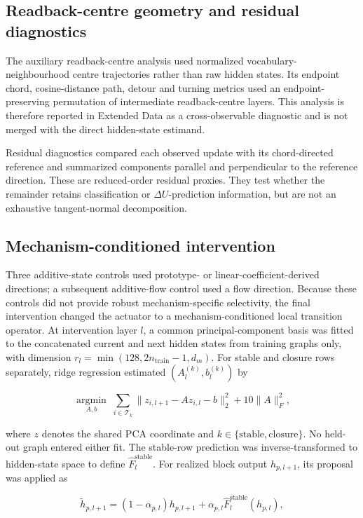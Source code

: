 \documentclass[12pt]{article}
\begin{document}
\subsection*{Readback-centre geometry and residual diagnostics}

The auxiliary readback-centre analysis used normalized vocabulary-neighbourhood centre trajectories rather than raw hidden states. Its endpoint chord, cosine-distance path, detour and turning metrics used an endpoint-preserving permutation of intermediate readback-centre layers. This analysis is therefore reported in Extended Data as a cross-observable diagnostic and is not merged with the direct hidden-state estimand.

Residual diagnostics compared each observed update with its chord-directed reference and summarized components parallel and perpendicular to the reference direction. These are reduced-order residual proxies. They test whether the remainder retains classification or \(\Delta U\)-prediction information, but are not an exhaustive tangent-normal decomposition.

\subsection*{Mechanism-conditioned intervention}

Three additive-state controls used prototype- or linear-coefficient-derived directions; a subsequent additive-flow control used a flow direction. Because these controls did not provide robust mechanism-specific selectivity, the final intervention changed the actuator to a mechanism-conditioned local transition operator. At intervention layer \(l\), a common principal-component basis was fitted to the concatenated current and next hidden states from training graphs only, with dimension \(r_l=\min(128,2n_{\mathrm{train}}-1,d_m)\). For stable and closure rows separately, ridge regression estimated \((A_l^{(k)},b_l^{(k)})\) by

\[
\underset{A,b}{\operatorname{argmin}}\;\sum_{i\in\mathcal T_k}\lVert z_{i,l+1}-Az_{i,l}-b\rVert_2^2+10\lVert A\rVert_F^2,
\]

where \(z\) denotes the shared PCA coordinate and \(k\in\{\mathrm{stable},\mathrm{closure}\}\). No held-out graph entered either fit. The stable-row prediction was inverse-transformed to hidden-state space to define \(\hat F_l^{\mathrm{stable}}\). For realized block output \(h_{p,l+1}\), its proposal was applied as

\[
\tilde h_{p,l+1}=(1-\alpha_{p,l})h_{p,l+1}+\alpha_{p,l}\hat F_l^{\mathrm{stable}}(h_{p,l}),
\]
\end{document}
